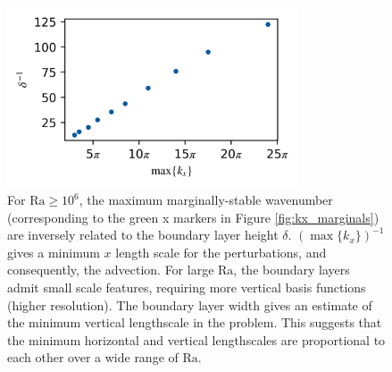 \documentclass[reprint,amsmath,amssymb,aps]{revtex4-1}
\newcommand\Ra{\mathrm{Ra}}
\begin{document}
\begin{figure}
    \centering
    \includegraphics[width=3.4in]{del_kx_inv.png}
    \caption{For $\Ra \geq 10^6$, the maximum marginally-stable wavenumber (corresponding to the green x markers in Figure \ref{fig:kx_marginals}) are inversely related to the boundary layer height $\delta$. 
    $(\max \{ k_x \})^{-1}$ gives a minimum $x$ length scale for the perturbations, and consequently, the advection. 
    For large $\Ra$, the boundary layers admit small scale features, requiring more vertical basis functions (higher resolution).
    The boundary layer width gives an estimate of the minimum vertical lengthscale in the problem.
    This suggests that the minimum horizontal and vertical lengthscales are proportional to each other over a wide range of $\Ra$.}
    \label{fig:del_inv}
\end{figure}
\end{document}
